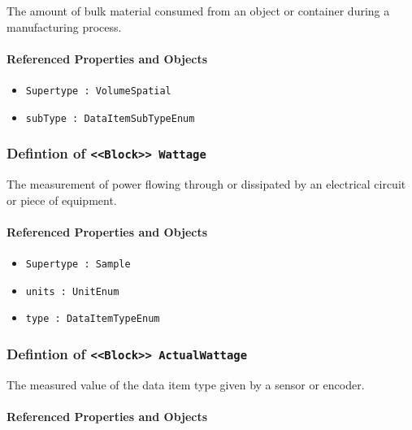 The amount of bulk material consumed from an object or container during a manufacturing process.

\FloatBarrier
\paragraph{Referenced Properties and Objects}

\begin{itemize}
\item \texttt{Supertype : VolumeSpatial}

\item \texttt{subType : DataItemSubTypeEnum}

\end{itemize}
\FloatBarrier
\subsubsection{Defintion of \texttt{<<Block>> Wattage}}
  \label{type:Wattage}

\FloatBarrier

The measurement of power flowing through or dissipated by an electrical circuit or piece of equipment.

\FloatBarrier
\paragraph{Referenced Properties and Objects}

\begin{itemize}
\item \texttt{Supertype : Sample}

\item \texttt{units : UnitEnum}

\item \texttt{type : DataItemTypeEnum}

\end{itemize}
\FloatBarrier
\subsubsection{Defintion of \texttt{<<Block>> ActualWattage}}
  \label{type:ActualWattage}

\FloatBarrier

The measured value of the data item type given by a sensor or encoder.

\FloatBarrier
\paragraph{Referenced Properties and Objects}

